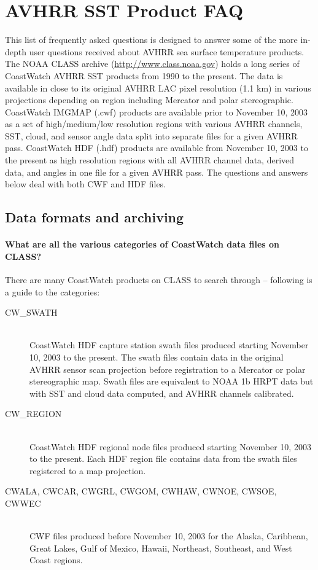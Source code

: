 \chapter{AVHRR SST Product FAQ}

This list of frequently asked questions is designed to answer
some of the more in-depth user questions received about AVHRR sea
surface temperature products.  The NOAA CLASS archive
(\url{http://www.class.noaa.gov}) holds a long series of
CoastWatch AVHRR SST products from 1990 to the present.  The data
is available in close to its original AVHRR LAC pixel resolution
(1.1 km) in various projections depending on region including
Mercator and polar stereographic.  CoastWatch IMGMAP (.cwf)
products are available prior to November 10, 2003 as a set of
high/medium/low resolution regions with various AVHRR channels,
SST, cloud, and sensor angle data split into separate files for a
given AVHRR pass.  CoastWatch HDF (.hdf) products are available
from November 10, 2003 to the present as high resolution regions
with all AVHRR channel data, derived data, and angles in one file
for a given AVHRR pass.  The questions and answers below deal
with both CWF and HDF files.

\section{Data formats and archiving}

\subsubsection*{What are all the various categories of CoastWatch data files on CLASS?}

There are many CoastWatch products on CLASS to search through --
following is a guide to the categories:
\begin{description}

\item[CW\_SWATH]~\\ CoastWatch HDF capture station swath files produced
starting November 10, 2003 to the present.  The swath files contain
data in the original AVHRR sensor scan projection before registration
to a Mercator or polar stereographic map.  Swath files are equivalent
to NOAA 1b HRPT data but with SST and cloud data computed, and AVHRR
channels calibrated.

\item[CW\_REGION]~\\ CoastWatch HDF regional node files produced
starting November 10, 2003 to the present.  Each HDF region file
contains data from the swath files registered to a map projection.

\item[CWALA, CWCAR, CWGRL, CWGOM, CWHAW, CWNOE, CWSOE, CWWEC]~\\ CWF
files produced before November 10, 2003 for the Alaska, Caribbean,
Great Lakes, Gulf of Mexico, Hawaii, Northeast, Southeast, and West
Coast regions.

\end{description}

